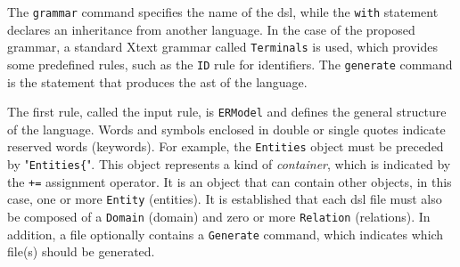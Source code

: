 The \texttt{grammar} command specifies the name of the \ac{dsl}, while the \texttt{with} statement declares an inheritance from another language.
In the case of the proposed grammar, a standard Xtext grammar called \texttt{Terminals} is used, which provides some predefined rules, such as the \texttt{ID} rule for identifiers.
The \texttt{generate} command is the statement that produces the \ac{ast} of the language.

The first rule, called the input rule, is \texttt{ERModel} and defines the general structure of the language.
Words and symbols enclosed in double or single quotes indicate reserved words (keywords).
For example, the \texttt{Entities} object must be preceded by "\texttt{Entities\{}".
This object represents a kind of \textit{container}, which is indicated by the \texttt{+=} assignment operator.
It is an object that can contain other objects, in this case, one or more \texttt{Entity} (entities).
It is established that each \ac{dsl} file must also be composed of a \texttt{Domain} (domain) and zero or more \texttt{Relation} (relations).
In addition, a file optionally contains a \texttt{Generate} command, which indicates which file(s) should be generated.


